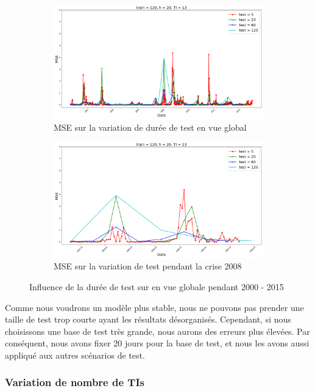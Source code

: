 \begin{figure}[H]
	\centering
	\begin{subfigure}{.5\textwidth}
	\includegraphics[width=.9\linewidth, scale=0.2]
	{plot/MSE_test_global.png}
	\caption{MSE sur la variation de durée de test en vue global}
	\label{fig:test_g}
	\end{subfigure}%
	\begin{subfigure}{.5\textwidth}
	\centering
	\includegraphics[width=.9\linewidth, scale=0.2]
	{plot/MSE_test_2008.png}
	\caption{MSE sur la variation de test pendant la crise 2008}
	\label{fig:test_2008}
	\end{subfigure}
\caption{Influence de la durée de test sur en vue globale pendant 2000 - 2015}
\label{fig:MSE_test}
\end{figure}

Comme nous voudrons un modèle plus stable, nous ne pouvons pas prender une taille de test trop courte ayant les résultats désorganisés. Cependant, si nous choisissons une base de test très grande, nous aurons des erreurs plus élevées. Par conséquent, nous avons fixer 20 jours pour la base de test, et nous les avons aussi appliqué aux autres scénarios de test.



\subsubsection{Variation de nombre de TIs}


